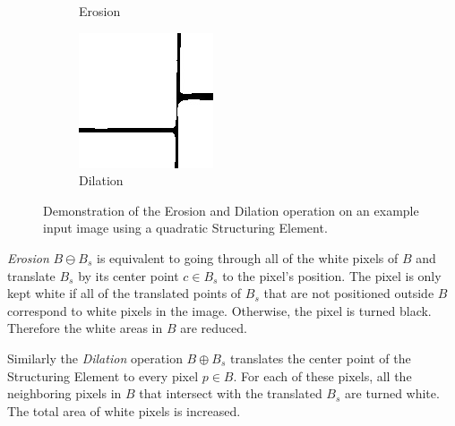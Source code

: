\documentclass[serif,article,noparskip]{agse-thesis}
\begin{document}
\begin{figure}
\begin{subfigure}{.3\textwidth}
  \caption{Erosion}
  \label{fig:erosion}
\end{subfigure}
\begin{subfigure}{.3\textwidth}
  \centering
  \includegraphics[width=\linewidth]{images/example-dilate.jpg}
  \caption{Dilation}
  \label{fig:dilation}
\end{subfigure}
\caption{Demonstration of the Erosion and Dilation operation on an example input image
using a quadratic Structuring Element.}
\label{fig:morphology}
\end{figure}

\textit{Erosion} $B \ominus B_s$ is equivalent to going through all of the white
pixels of $B$ and translate $B_s$ by its center point $c \in B_s$ to the pixel's
position. The pixel is only kept white if all of the translated points of $B_s$
that are not positioned outside $B$ correspond to white pixels in the image.
Otherwise, the pixel is turned black. Therefore the white areas in $B$ are
reduced. \cite{Smith1997}

Similarly the \textit{Dilation} operation  $B \oplus B_s$ translates the center
point of the Structuring Element to every pixel $p \in B$. For each of these
pixels, all the neighboring pixels in $B$ that intersect with the translated
$B_s$ are turned white. The total area of white pixels is increased.
\cite{Smith1997}
\end{document}
